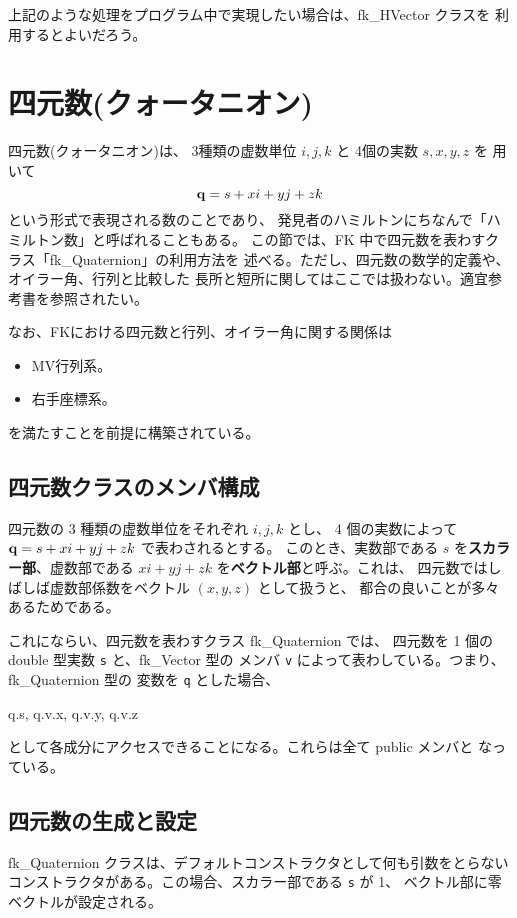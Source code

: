 上記のような処理をプログラム中で実現したい場合は、fk\_HVector クラスを
利用するとよいだろう。

\section{四元数(クォータニオン)}
四元数(クォータニオン)は、
3種類の虚数単位 \(i, j, k\) と
4個の実数 \(s, x, y, z\) を
用いて
\[
	\mathbf{q} = s + xi + yj + zk
\]
という形式で表現される数のことであり、
発見者のハミルトンにちなんで「ハミルトン数」と呼ばれることもある。
この節では、FK 中で四元数を表わすクラス「fk\_Quaternion」の利用方法を
述べる。ただし、四元数の数学的定義や、オイラー角、行列と比較した
長所と短所に関してはここでは扱わない。適宜参考書を参照されたい。

なお、FKにおける四元数と行列、オイラー角に関する関係は
\begin{itemize}
 \item MV行列系。
 \item 右手座標系。
\end{itemize}
を満たすことを前提に構築されている。

\subsection{四元数クラスのメンバ構成}
四元数の 3 種類の虚数単位をそれぞれ \(i, j, k\) とし、
4 個の実数によって \(\mathbf{q} = s + xi + yj + zk\) で表わされるとする。
このとき、実数部である \(s\) を\textbf{スカラー部}、虚数部である
\(xi + yj + zk\) を\textbf{ベクトル部}と呼ぶ。これは、
四元数ではしばしば虚数部係数をベクトル \((x, y, z)\) として扱うと、
都合の良いことが多々あるためである。

これにならい、四元数を表わすクラス fk\_Quaternion では、
四元数を 1 個の double 型実数 \verb+s+ と、fk\_Vector 型の
メンバ \verb+v+ によって表わしている。つまり、fk\_Quaternion 型の
変数を \verb+q+ とした場合、
\begin{center}
q.s, \quad q.v.x, \quad q.v.y, \quad q.v.z
\end{center}
として各成分にアクセスできることになる。これらは全て public メンバと
なっている。

\subsection{四元数の生成と設定}
fk\_Quaternion クラスは、デフォルトコンストラクタとして何も引数をとらない
コンストラクタがある。この場合、スカラー部である \verb+s+ が 1、
ベクトル部に零ベクトルが設定される。

